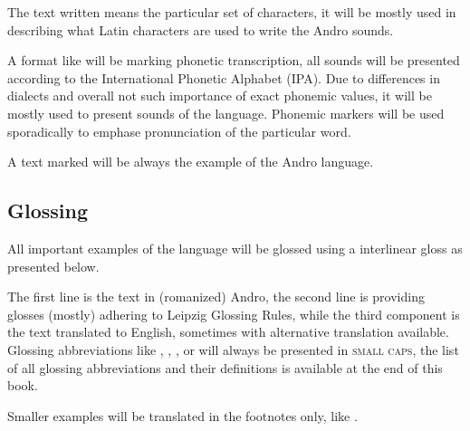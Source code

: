 The text written  means the particular set of characters, it will
be mostly used in describing what Latin characters are used to write the Andro
sounds.

A format like  will be marking phonetic transcription, all
sounds will be presented according to the International Phonetic Alphabet (IPA).
Due to differences in dialects and overall not such importance of exact phonemic
values, it will be mostly used to present sounds of the language. Phonemic
markers  will be used sporadically to emphase pronunciation of
the particular word.

A text marked  will be always the example of the Andro
language.

\subsection{Glossing}

All important examples of the language will be glossed using a interlinear gloss
as presented below.


The first line is the text in (romanized) Andro, the second line is providing
glosses (mostly) adhering to Leipzig Glossing Rules, while the third component
is the text translated to English, sometimes with alternative translation
available. Glossing abbreviations like \Dem{}, \Inan{}, \Rel{}, \Refl{} or
\Top{} will always be presented in \textsc{small caps}, the list of all glossing
abbreviations and their definitions is available at the end of this book.

Smaller examples will be translated in the footnotes only, like
.